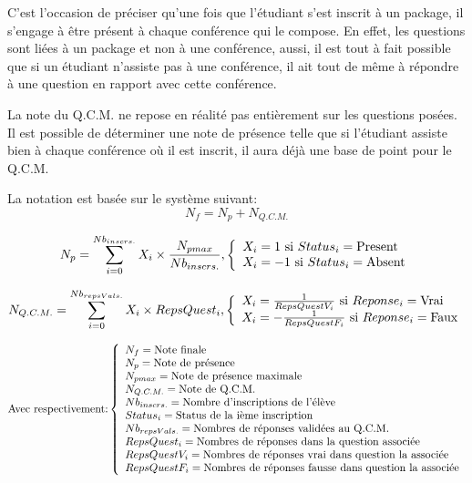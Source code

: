 C'est l'occasion de préciser qu'une fois que l'étudiant s'est inscrit à un package, il s'engage à être présent à chaque
conférence qui le compose. En effet, les questions sont liées à un package et non à une conférence, aussi, il est tout à fait
possible que si un étudiant n'assiste pas à une conférence, il ait tout de même à répondre à une question en rapport avec cette
conférence.

La note du Q.C.M. ne repose en réalité pas entièrement sur les questions posées. Il est possible de déterminer une note de présence
telle que si l'étudiant assiste bien à chaque conférence où il est inscrit, il aura déjà une base de point pour le Q.C.M.

La notation est basée sur le système suivant:
\begin{equation}N_{f} = N_{p} + N_{Q.C.M.}\end{equation}

\begin{equation}
    N_{p} = \sum_{i = 0}^{Nb_{inscrs.}} X_{i} \times \frac{N_{pmax}}{Nb_{inscrs.}} {,}
    \left\{
    \begin{array}{l l}
        X_{i} = 1 \text{ si }Status_{i} = \text{Present}\\
        X_{i} = -1\text{ si }Status_{i} = \text{Absent}\\
    \end{array}
    \right.
\end{equation}

\begin{equation}
    N_{Q.C.M.} = \sum_{i = 0}^{Nb_{repsVals.}} X_{i} \times RepsQuest_{i} {,}
    \left\{
    \begin{array}{l l}
        X_{i} = \frac{1}{RepsQuestV_{i}} \text{ si }Reponse_{i} = \text{Vrai}\\
        X_{i} = -\frac{1}{RepsQuestF_{i}} \text{ si }Reponse_{i} = \text{Faux}\\
    \end{array}
    \right.
\end{equation}

$$
\text{Avec respectivement:}
\left\{
\begin{array}{l l l l l l l l}
N_{f} = \text{Note finale}\\
N_{p} = \text{Note de présence}\\
N_{pmax} = \text{Note de présence maximale}\\
N_{Q.C.M.} = \text{Note de Q.C.M.}\\
Nb_{inscrs.} = \text{Nombre d'inscriptions de l'élève}\\
Status_{i} = \text{Status de la ième inscription}\\
Nb_{repsVals.} = \text{Nombres de réponses validées au Q.C.M.}\\
RepsQuest_{i} = \text{Nombres de réponses dans la question associée}\\
RepsQuestV_{i} = \text{Nombres de réponses vrai dans question la associée}\\
RepsQuestF_{i} = \text{Nombres de réponses fausse dans question la associée}\\
\end{array}
\right.
$$

